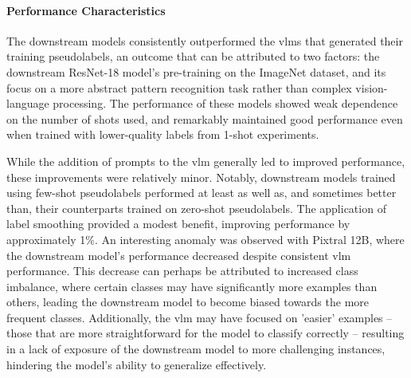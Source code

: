 \documentclass[../ShajiS_RnDReport.tex]{subfiles}
\begin{document}
\paragraph{Performance Characteristics}
The downstream models consistently outperformed the \glspl{vlm} that generated their training pseudolabels, an outcome that can be attributed to two factors: the downstream ResNet-18 model's pre-training on the ImageNet dataset, and its focus on a more abstract pattern recognition task rather than complex vision-language processing. The performance of these models showed weak dependence on the number of shots used, and remarkably maintained good performance even when trained with lower-quality labels from 1-shot experiments.

While the addition of prompts to the \gls{vlm} generally led to improved performance, these improvements were relatively minor. Notably, downstream models trained using few-shot pseudolabels performed at least as well as, and sometimes better than, their counterparts trained on zero-shot pseudolabels. The application of label smoothing provided a modest benefit, improving performance by approximately 1\%. An interesting anomaly was observed with Pixtral 12B, where the downstream model's performance decreased despite consistent \gls{vlm} performance. This decrease can perhaps be attributed to increased class imbalance, where certain classes may have significantly more examples than others, leading the downstream model to become biased towards the more frequent classes. Additionally, the \gls{vlm} may have focused on 'easier' examples -- those that are more straightforward for the model to classify correctly -- resulting in a lack of exposure of the downstream model to more challenging instances, hindering the model's ability to generalize effectively.
\end{document}
